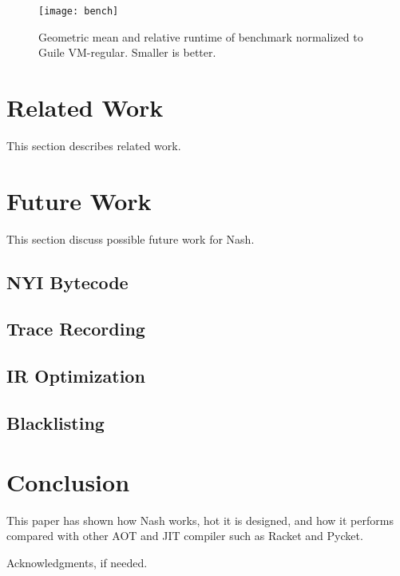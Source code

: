 \documentclass[preprint, numbers]{sigplanconf}
\begin{document}
\begin{figure}
  \centering
  \texttt{[image: bench]}
  \caption{Geometric mean and relative runtime of benchmark normalized to
    Guile VM-regular. Smaller is better.}
  \label{fig:bench}
\end{figure}

\section{Related Work}
\label{sec:related}
This section describes related work.

\section{Future Work}
\label{sec:future}
This section discuss possible future work for Nash.

\subsection{NYI Bytecode}
\subsection{Trace Recording}
\subsection{IR Optimization}
\subsection{Blacklisting}

\section{Conclusion}
\label{sec:conclusion}
This paper has shown how Nash works, hot it is designed, and how it performs
compared with other AOT and JIT compiler such as Racket and Pycket.



\acks

Acknowledgments, if needed.

\end{document}
